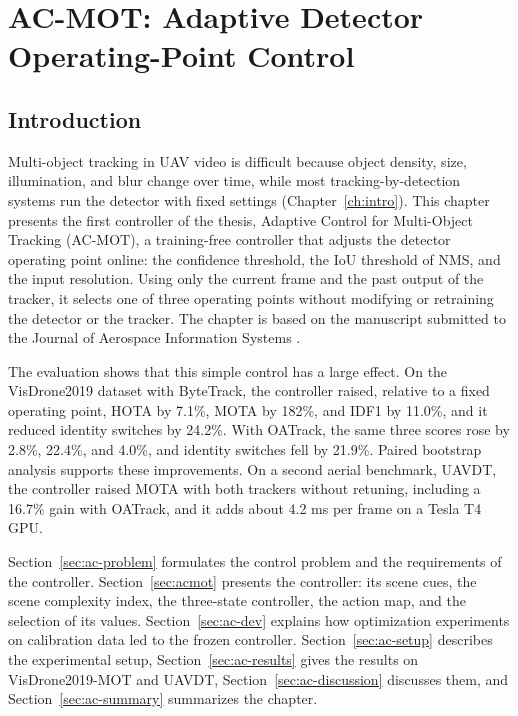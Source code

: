 \chapter{AC-MOT: Adaptive Detector Operating-Point Control}\label{ch:acmot}

\section{Introduction}\label{sec:ac-intro}
Multi-object tracking in UAV video is difficult because object density, size, illumination, and blur change over time, while most tracking-by-detection systems run the detector with fixed settings (Chapter~\ref{ch:intro}). This chapter presents the first controller of the thesis, Adaptive Control for Multi-Object Tracking (AC-MOT), a training-free controller that adjusts the detector operating point online: the confidence threshold, the IoU threshold of NMS, and the input resolution. Using only the current frame and the past output of the tracker, it selects one of three operating points without modifying or retraining the detector or the tracker. The chapter is based on the manuscript submitted to the Journal of Aerospace Information Systems \cite{ismail2026acmot}.

The evaluation shows that this simple control has a large effect. On the VisDrone2019 dataset with ByteTrack, the controller raised, relative to a fixed operating point, HOTA by 7.1\%, MOTA by 182\%, and IDF1 by 11.0\%, and it reduced identity switches by 24.2\%. With OATrack, the same three scores rose by 2.8\%, 22.4\%, and 4.0\%, and identity switches fell by 21.9\%. Paired bootstrap analysis supports these improvements. On a second aerial benchmark, UAVDT, the controller raised MOTA with both trackers without retuning, including a 16.7\% gain with OATrack, and it adds about 4.2 ms per frame on a Tesla T4 GPU.

Section~\ref{sec:ac-problem} formulates the control problem and the requirements of the controller. Section~\ref{sec:acmot} presents the controller: its scene cues, the scene complexity index, the three-state controller, the action map, and the selection of its values. Section~\ref{sec:ac-dev} explains how optimization experiments on calibration data led to the frozen controller. Section~\ref{sec:ac-setup} describes the experimental setup, Section~\ref{sec:ac-results} gives the results on VisDrone2019-MOT and UAVDT, Section~\ref{sec:ac-discussion} discusses them, and Section~\ref{sec:ac-summary} summarizes the chapter.

